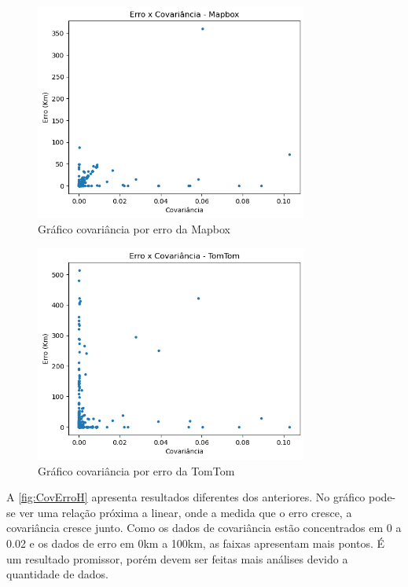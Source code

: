 \begin{figure}[h]
  \centering
  \includegraphics[width=0.8\textwidth]{Figuras/ErroCovM.png}
  \caption{Gráfico covariância por erro da Mapbox}
  \label{fig:CovErroM}
\end{figure}

\begin{figure}[h]
  \centering
  \includegraphics[width=0.8\textwidth]{Figuras/ErroCovT.png}
  \caption{Gráfico covariância por erro da TomTom}
  \label{fig:CovErroT}
\end{figure}

A \ref{fig:CovErroH} apresenta resultados diferentes dos anteriores. No gráfico pode-se ver uma relação próxima a linear, onde a medida que o erro cresce, a covariância cresce junto. Como os dados de covariância estão concentrados em 0 a 0.02 e os dados de erro em 0km a 100km, as faixas apresentam mais pontos. É um resultado promissor, porém devem ser feitas mais análises devido a quantidade de dados. 


